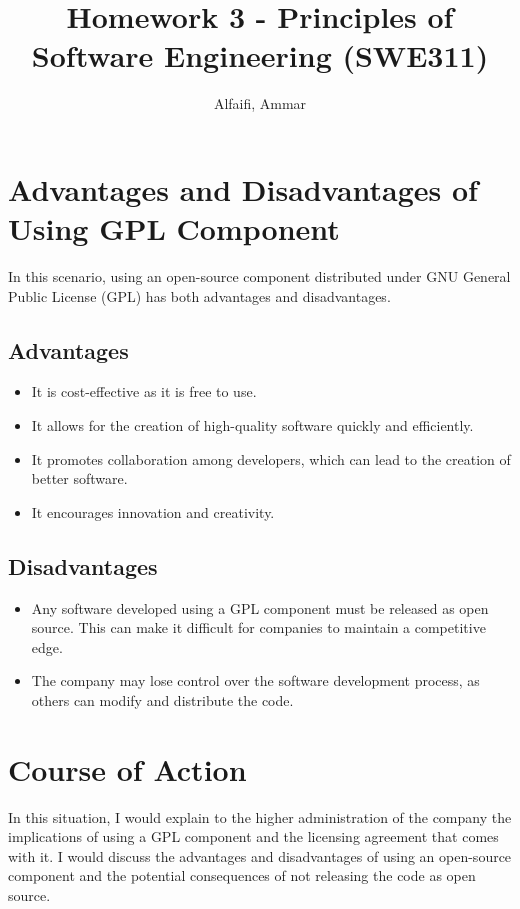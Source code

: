 \documentclass{article}
\title{Homework 3 - Principles of Software Engineering (SWE311)}
\author{Alfaifi, Ammar}
\date{}
\begin{document}
\maketitle


\section{Advantages and Disadvantages of Using GPL Component}
In this scenario, using an open-source component distributed under GNU General Public License (GPL) has both advantages and disadvantages.

\subsection{Advantages}
\begin{itemize}
    \item It is cost-effective as it is free to use.
    \item It allows for the creation of high-quality software quickly and efficiently.
    \item It promotes collaboration among developers, which can lead to the creation of better software.
    \item It encourages innovation and creativity.
\end{itemize}

\subsection{Disadvantages}
\begin{itemize}
    \item Any software developed using a GPL component must be released as open source. This can make it difficult for companies to maintain a competitive edge.
    \item The company may lose control over the software development process, as others can modify and distribute the code.
\end{itemize}

\section{Course of Action}
In this situation, I would explain to the higher administration of the company the implications of using a GPL component and the licensing agreement that comes with it. I would discuss the advantages and disadvantages of using an open-source component and the potential consequences of not releasing the code as open source.
\end{document}
